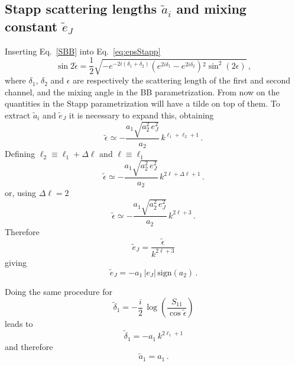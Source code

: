 \documentclass[10pt,a4paper]{article}
\newcommand{\eq}[1]{Eq.~#1}
\newcommand{\mtm}[1]{\mathrm{#1}}
\begin{document}
\begin{appendices}
		
		\subsection{Stapp scattering lengths $\tilde{a}_i$ and mixing constant $\tilde{e}_J$}
		Inserting \eq{\eqref{SBB}} into \eq{\eqref{eq:epsStapp}} 
		\begin{equation}
			\sin2\tilde{\epsilon}
			=
			\frac{1}{2}\sqrt{- e^{-2 i \left(\delta _1+\delta _2\right)} \left(e^{2 i \delta _1}-e^{2 i \delta _2}\right){}^2 \sin ^2(2 \epsilon )}\,,
		\end{equation}
		where $\delta_1$, $\delta_2$ and $\epsilon$ are respectively the scattering length of the first and second channel, and the mixing angle in the BB parametrization. 
		From now on the quantities in the Stapp parametrization will have a tilde on top of them.
		To extract $\tilde{a}_i$ and $\tilde{e}_J$ it is necessary to expand this, obtaining
		\begin{equation}
			\tilde{\epsilon} \simeq - \frac{a_1\sqrt{a_2^2\,e_J^2}}{a_2}\,k^{\ell_1+\ell_2+1}\,.
		\end{equation}
		Defining $\ell_2\equiv\ell_1+\Delta \ell$ and $\ell\equiv \ell_1$
		\begin{equation}
			\tilde{\epsilon} \simeq - \frac{a_1\sqrt{a_2^2\,e_J^2}}{a_2}\,k^{2\ell+\Delta \ell +1}\,.
		\end{equation}
		or, using $\Delta\ell = 2$ 
		\begin{equation}
			\tilde{\epsilon} \simeq - \frac{a_1\sqrt{a_2^2\,e_J^2}}{a_2}\,k^{2\ell+3}\,.
		\end{equation}
		Therefore 
		\begin{equation}
			\tilde{e}_J = \frac{\tilde{\epsilon}}{k^{2\ell+3}}
		\end{equation}
		giving
		\begin{equation}
			\tilde{e}_J =
			-a_1\,|e_J|\,\mtm{sign}(a_2)\,.
		\end{equation}
		
		Doing the same procedure for 
		\begin{equation}
			\tilde{\delta}_1 = -\frac{i}{2}\,\log\left(\frac{S_{11}}{\cos\tilde{\epsilon}}\right)
		\end{equation}
		leads to
		\begin{equation}
			\tilde{\delta}_1 = -a_1\,k^{2\ell_1+1} 
		\end{equation}
		and therefore
		\begin{equation}
			\tilde{a}_1 = a_1\,.
		\end{equation}
		

\end{appendices}
\end{document}
